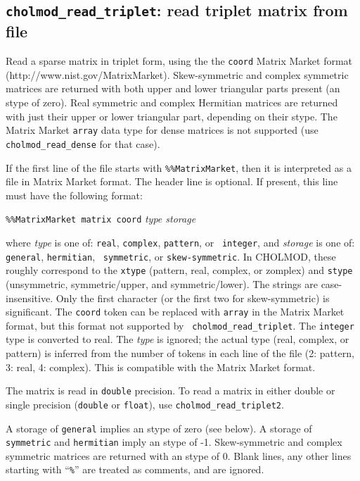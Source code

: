 \documentclass[11pt]{article}
\begin{document}
\subsection{{\tt cholmod\_read\_triplet}: read triplet matrix from file}


Read a sparse matrix in triplet form, using the the {\tt coord} Matrix Market
format (http://www.nist.gov/MatrixMarket).  Skew-symmetric and complex
symmetric matrices are returned with both upper and lower triangular parts
present (an stype of zero).  Real symmetric and complex Hermitian matrices are
returned with just their upper or lower triangular part, depending on their
stype.  The Matrix Market {\tt array} data type for dense matrices is not
supported (use {\tt cholmod\_read\_dense} for that case).

If the first line of the file starts with {\tt \%\%MatrixMarket}, then it is
interpreted as a file in Matrix Market format.  The header line is optional.
If present, this line must have the following format:
\vspace{0.1in}

        {\tt \%\%MatrixMarket matrix coord} {\em type storage}

\vspace{0.1in}
\noindent
where {\em type} is one of: {\tt real}, {\tt complex}, {\tt pattern}, or {\tt
integer}, and {\em storage} is one of: {\tt general}, {\tt hermitian}, {\tt
symmetric}, or {\tt skew-symmetric}.  In CHOLMOD, these roughly correspond to
the {\tt xtype} (pattern, real, complex, or zomplex) and {\tt stype}
(unsymmetric, symmetric/upper, and symmetric/lower).  The strings are
case-insensitive.  Only the first character (or the first two for
skew-symmetric) is significant.  The {\tt coord} token can be replaced with
{\tt array} in the Matrix Market format, but this format not supported by {\tt
cholmod\_read\_triplet}.  The {\tt integer} type is converted to real.  The
{\em type} is ignored; the actual type (real, complex, or pattern) is inferred
from the number of tokens in each line of the file (2: pattern, 3: real, 4:
complex).  This is compatible with the Matrix Market format.

The matrix is read in {\tt double} precision.  To read a matrix
in either double or single precision ({\tt double} or {\tt float}),
use \verb'cholmod_read_triplet2'.

A storage of {\tt general} implies an stype of zero (see below).  A storage of
{\tt symmetric} and {\tt hermitian} imply an stype of -1.  Skew-symmetric and
complex symmetric matrices are returned with an stype of 0.  Blank lines, any
other lines starting with ``{\tt \%}'' are treated as comments, and are
ignored.
\end{document}
